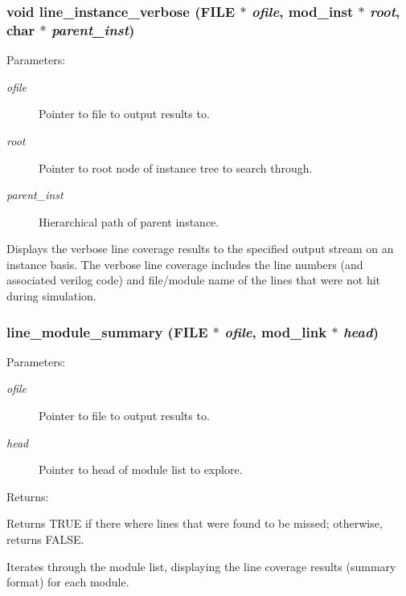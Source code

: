 \subsubsection{\setlength{\rightskip}{0pt plus 5cm}void line\_\-instance\_\-verbose (FILE $\ast$ {\em ofile}, {\bf mod\_\-inst} $\ast$ {\em root}, char $\ast$ {\em parent\_\-inst})}\label{line_8c_a10}


\begin{Desc}
\item[Parameters: ]\par
\begin{description}
\item[{\em 
ofile}]Pointer to file to output results to. \item[{\em 
root}]Pointer to root node of instance tree to search through. \item[{\em 
parent\_\-inst}]Hierarchical path of parent instance.\end{description}
\end{Desc}
Displays the verbose line coverage results to the specified output stream on an instance basis. The verbose line coverage includes the line numbers  (and associated verilog code) and file/module name of the lines that were  not hit during simulation. 
\subsubsection{ line\_\-module\_\-summary (FILE $\ast$ {\em ofile}, {\bf mod\_\-link} $\ast$ {\em head})}\label{line_8c_a8}


\begin{Desc}
\item[Parameters: ]\par
\begin{description}
\item[{\em 
ofile}]Pointer to file to output results to. \item[{\em 
head}]Pointer to head of module list to explore.\end{description}
\end{Desc}
\begin{Desc}
\item[Returns: ]\par
Returns TRUE if there where lines that were found to be missed; otherwise, returns FALSE.\end{Desc}
Iterates through the module list, displaying the line coverage results (summary format) for each module. 
